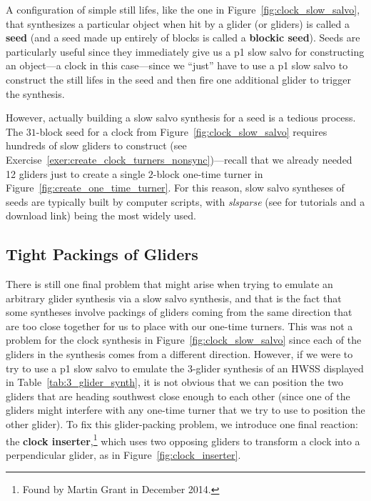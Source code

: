 A configuration of simple still lifes, like the one in Figure~\ref{fig:clock_slow_salvo}, that synthesizes a particular object when hit by a glider (or gliders) is called a \textbf{seed} (and a seed made up entirely of blocks is called a \textbf{blockic seed}). Seeds are particularly useful since they immediately give us a p1 slow salvo for constructing an object---a clock in this case---since we ``just'' have to use a p1 slow salvo to construct the still lifes in the seed and then fire one additional glider to trigger the synthesis.

However, actually building a slow salvo synthesis for a seed is a tedious process. The $31$-block seed for a clock from Figure~\ref{fig:clock_slow_salvo} requires hundreds of slow gliders to construct (see Exercise~\ref{exer:create_clock_turners_nonsync})---recall that we already needed 12 gliders just to create a single $2$-block one-time turner in Figure~\ref{fig:create_one_time_turner}. For this reason, slow salvo syntheses of seeds are typically built by computer scripts, with \emph{slsparse} (see  for tutorials and a download link) being the most widely used.%


\subsection{Tight Packings of Gliders}\label{sec:slow_salvo_tight}

There is still one final problem that might arise when trying to emulate an arbitrary glider synthesis via a slow salvo synthesis, and that is the fact that some syntheses involve packings of gliders coming from the same direction that are too close together for us to place with our one-time turners. This was not a problem for the clock synthesis in Figure~\ref{fig:clock_slow_salvo} since each of the gliders in the synthesis comes from a different direction. However, if we were to try to use a p1 slow salvo to emulate the 3-glider synthesis of an HWSS displayed in Table~\ref{tab:3_glider_synth}, it is not obvious that we can position the two gliders that are heading southwest close enough to each other (since one of the gliders might interfere with any one-time turner that we try to use to position the other glider). To fix this glider-packing problem, we introduce one final reaction: the \textbf{clock inserter},\footnote{Found by Martin Grant in December 2014.} which uses two opposing gliders to transform a clock into a perpendicular glider, as in Figure~\ref{fig:clock_inserter}.

